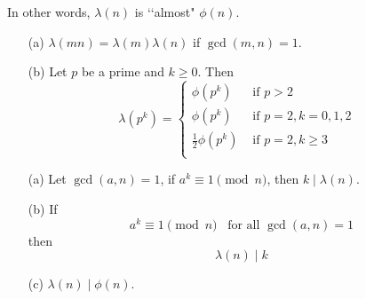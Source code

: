 In other words, $\lambda(n)$ is \lq\lq almost" $\phi(n)$.

\begin{thm}
  \mbox{}
  \begin{enumerate}[nosep]
  \item[\textnormal{(a)}]
    $\lambda(mn) = \lambda(m) \lambda(n)$ if $\gcd(m,n) = 1$.
  \item[\textnormal{(b)}]
    Let $p$ be a prime and $k \geq 0$. Then
    \[
    \lambda(p^k)
    =
    \begin{cases}
      \phi(p^k) & \text{ if $p > 2$ } \\
      \phi(p^k) & \text{ if $p = 2, k = 0, 1, 2$ } \\
      \frac{1}{2} \phi(p^k) & \text{ if $p = 2, k \geq 3$ } \\      
    \end{cases}
    \]
  \end{enumerate}
\end{thm}

\begin{thm}
  \mbox{}
  \begin{enumerate}[nosep]
  \item[\textnormal{(a)}] Let $\gcd(a, n) = 1$, if $a^k \equiv 1 \pmod{n}$, then
    $k \mid \lambda(n)$.
  \item[\textnormal{(b)}] If
    \[
    a^k \equiv 1 \pmod{n} \,\,\, \text{ for all $\gcd(a, n) = 1$}
    \]
    then
    \[
    \lambda(n) \mid k
    \]
  \item[\textnormal{(c)}] $\lambda(n) \mid \phi(n)$.
  \end{enumerate}
\end{thm}

